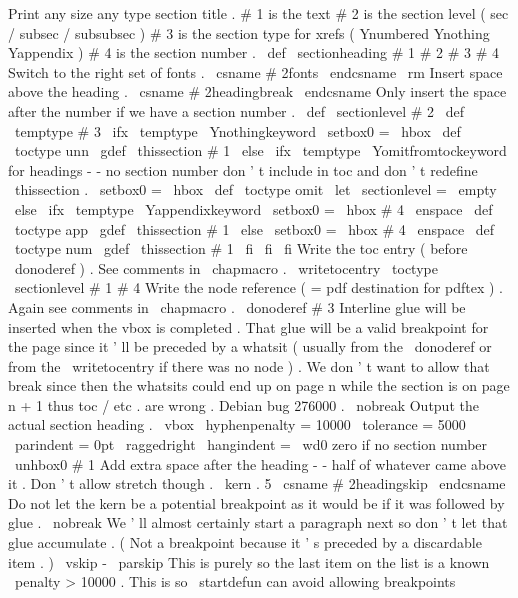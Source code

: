 {{{}
%
Print
any
size
any
type
section
title
.
%
%
#
1
is
the
text
#
2
is
the
section
level
(
sec
/
subsec
/
subsubsec
)
#
3
is
%
the
section
type
for
xrefs
(
Ynumbered
Ynothing
Yappendix
)
#
4
is
the
%
section
number
.
%
\
def
\
sectionheading
#
1
#
2
#
3
#
4
{
%
{
%
%
Switch
to
the
right
set
of
fonts
.
\
csname
#
2fonts
\
endcsname
\
rm
%
%
Insert
space
above
the
heading
.
\
csname
#
2headingbreak
\
endcsname
%
%
Only
insert
the
space
after
the
number
if
we
have
a
section
number
.
\
def
\
sectionlevel
{
#
2
}
%
\
def
\
temptype
{
#
3
}
%
%
\
ifx
\
temptype
\
Ynothingkeyword
\
setbox0
=
\
hbox
{
}
%
\
def
\
toctype
{
unn
}
%
\
gdef
\
thissection
{
#
1
}
%
\
else
\
ifx
\
temptype
\
Yomitfromtockeyword
%
for
headings
-
-
no
section
number
don
'
t
include
in
toc
%
and
don
'
t
redefine
\
thissection
.
\
setbox0
=
\
hbox
{
}
%
\
def
\
toctype
{
omit
}
%
\
let
\
sectionlevel
=
\
empty
\
else
\
ifx
\
temptype
\
Yappendixkeyword
\
setbox0
=
\
hbox
{
#
4
\
enspace
}
%
\
def
\
toctype
{
app
}
%
\
gdef
\
thissection
{
#
1
}
%
\
else
\
setbox0
=
\
hbox
{
#
4
\
enspace
}
%
\
def
\
toctype
{
num
}
%
\
gdef
\
thissection
{
#
1
}
%
\
fi
\
fi
\
fi
%
%
Write
the
toc
entry
(
before
\
donoderef
)
.
See
comments
in
\
chapmacro
.
\
writetocentry
{
\
toctype
\
sectionlevel
}
{
#
1
}
{
#
4
}
%
%
%
Write
the
node
reference
(
=
pdf
destination
for
pdftex
)
.
%
Again
see
comments
in
\
chapmacro
.
\
donoderef
{
#
3
}
%
%
%
Interline
glue
will
be
inserted
when
the
vbox
is
completed
.
%
That
glue
will
be
a
valid
breakpoint
for
the
page
since
it
'
ll
be
%
preceded
by
a
whatsit
(
usually
from
the
\
donoderef
or
from
the
%
\
writetocentry
if
there
was
no
node
)
.
We
don
'
t
want
to
allow
that
%
break
since
then
the
whatsits
could
end
up
on
page
n
while
the
%
section
is
on
page
n
+
1
thus
toc
/
etc
.
are
wrong
.
Debian
bug
276000
.
\
nobreak
%
%
Output
the
actual
section
heading
.
\
vbox
{
\
hyphenpenalty
=
10000
\
tolerance
=
5000
\
parindent
=
0pt
\
raggedright
\
hangindent
=
\
wd0
%
zero
if
no
section
number
\
unhbox0
#
1
}
%
}
%
%
Add
extra
space
after
the
heading
-
-
half
of
whatever
came
above
it
.
%
Don
'
t
allow
stretch
though
.
\
kern
.
5
\
csname
#
2headingskip
\
endcsname
%
%
Do
not
let
the
kern
be
a
potential
breakpoint
as
it
would
be
if
it
%
was
followed
by
glue
.
\
nobreak
%
%
We
'
ll
almost
certainly
start
a
paragraph
next
so
don
'
t
let
that
%
glue
accumulate
.
(
Not
a
breakpoint
because
it
'
s
preceded
by
a
%
discardable
item
.
)
\
vskip
-
\
parskip
%
%
This
is
purely
so
the
last
item
on
the
list
is
a
known
\
penalty
>
%
10000
.
This
is
so
\
startdefun
can
avoid
allowing
breakpoints
}}}
